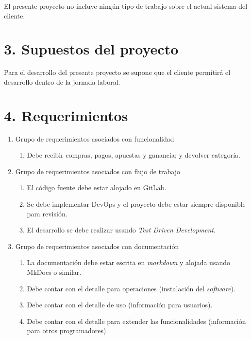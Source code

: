 \documentclass[11pt]{charter}
\begin{document}
El presente proyecto no incluye ningún tipo de trabajo sobre el actual sistema del cliente.

\section{3. Supuestos del proyecto}
\label{sec:supuestos}

Para el desarrollo del presente proyecto se supone que el cliente permitirá el desarrollo dentro de la jornada laboral.

\section{4. Requerimientos}
\label{sec:requerimientos}

\begin{enumerate}
\item Grupo de requerimientos asociados con funcionalidad
	\begin{enumerate}
	\item Debe recibir compras, pagos, apuestas y ganancia; y devolver categoría.
	\end{enumerate}
\item Grupo de requerimientos asociados con flujo de trabajo
	\begin{enumerate}
	\item El código fuente debe estar alojado en GitLab.
	\item Se debe implementar DevOps y el proyecto debe estar siempre disponible para revisión.
	\item El desarrollo se debe realizar usando \textit{Test Driven Development}.
	\end{enumerate}
\item Grupo de requerimientos asociados con documentación
  \begin{enumerate}
    \item La documentación debe estar escrita en \textit{markdown} y alojada usando MkDocs o similar.
    \item Debe contar con el detalle para operaciones (instalación del \textit{software}).
    \item Debe contar con el detalle de uso (información para usuarios).
    \item Debe contar con el detalle para extender las funcionalidades (información para otros programadores).
  \end{enumerate}
\end{enumerate}
\end{document}
